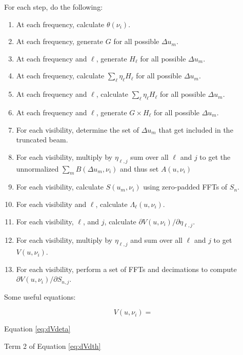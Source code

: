\documentclass[]{article}
\begin{document}
For each step, do the following:
\begin{enumerate}
\item At each frequency, calculate $\theta(\nu_i)$.

\item At each frequency, generate $G$ for all possible $\Delta u_m$.

\item At each frequency and $\ell$, generate $H_\ell$ for all possible $\Delta u_m$.

\item At each frequency, calculate $\sum_\ell \eta_\ell H_\ell$ for all possible $\Delta u_m$.

\item At each frequency and $\ell$, calculate $\sum_\ell \eta_\ell H_\ell$ for all possible $\Delta u_m$.

\item At each frequency and $\ell$, generate $G \times H_\ell$ for all possible $\Delta u_m$.

\item For each visibility, determine the set of $\Delta u_m$ that get included in the truncated beam.

\item For each visibility, multiply by $\eta_{\ell,j}$ sum over all $\ell$ and $j$ to get the unnormalized $\sum_m B(\Delta u_m,\nu_i)$ and thus set $A(u,\nu_i)$

\item For each visibility, calculate $S(u_m,\nu_i)$ using zero-padded FFTs of $S_n$.

\item For each visibility and $\ell$, calculate $\Lambda_\ell(u,\nu_i)$.

\item For each visibility, $\ell$, and $j$, calculate $\partial V(u,\nu_i) / \partial \eta_{\ell,j}$.

\item For each visibility, multiply by $\eta_{\ell,j}$ and sum over all $\ell$ and $j$ to get $V(u,\nu_i)$.

\item For each visibility, perform a set of FFTs and decimations to compute $\partial V(u,\nu_i) / \partial S_{n,j}$.


%

\end{enumerate}

Some useful equations:

\begin{equation}
V(u,\nu_i) = 
\end{equation}


Equation \ref{eq:dVdeta} 





Term 2 of Equation \ref{eq:dVdth} 
\end{document}
